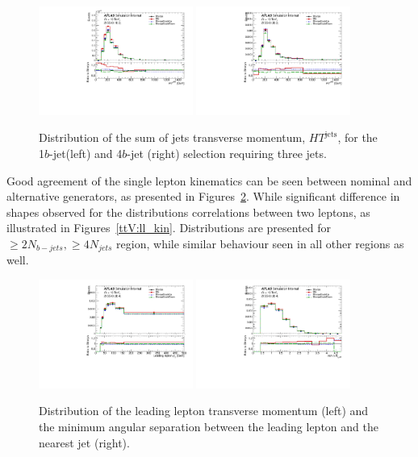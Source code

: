 \begin{figure}[!htb]
\centering
\includegraphics[width=0.45\textwidth]{Plots/ttV/c_Region_2_HT_jets}
\includegraphics[width=0.45\textwidth]{Plots/ttV/c_Region_3_HT_jets}\\
  \caption{Distribution of the sum of jets transverse momentum, $HT^{\text{jets}}$, for the 1$b$-jet(left) and 4$b$-jet (right) selection requiring three jets. \label{ttV:3j12b}}
\end{figure}

Good agreement of the single lepton kinematics can be seen between nominal and alternative generators, as presented in Figures~\ref{ttV:lep_kin}.
While significant difference in shapes observed for the distributions  correlations between two leptons, as illustrated in Figures~\ref{ttV:ll_kin}. Distributions are presented for $\geq2N_{b-jets},\geq4N_{jets}$ region, while similar behaviour seen in all other regions as well.

\begin{figure}[!htb]
\centering
\includegraphics[width=0.45\textwidth]{Plots/ttV/c_Region_1_lep_Pt_0}
\includegraphics[width=0.45\textwidth]{Plots/ttV/c_Region_1_min_DRl0j}\\
  \caption{Distribution of the leading lepton transverse momentum (left) and the minimum angular separation between the leading lepton and the nearest jet (right).
  \label{ttV:lep_kin}}
\end{figure}

